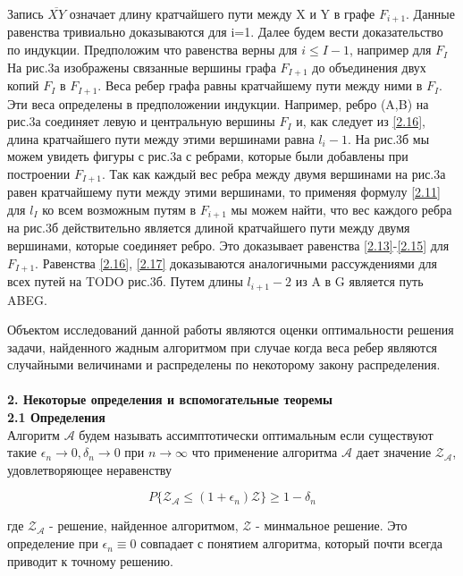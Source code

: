 \documentclass[a4paper, 14pt]{extarticle}
\begin{document}
Запись $\overline {XY}$ означает длину кратчайшего пути между X и Y в графе $F_{i+1}$. Данные равенства тривиально доказываются для i=1. Далее будем вести доказательство по индукции. Предположим что равенства верны для $i \leq I-1$, например для $F_I$ На рис.3а изображены связанные вершины графа $F_{I+1}$ до объединения двух копий $F_I$ в $F_{I+1}$. Веса ребер графа равны кратчайшему пути между ними в $F_I$. Эти веса определены в предположении индукции. Например, ребро (A,B) на рис.3а соединяет левую и центральную вершины $F_I$ и, как следует из \ref{2.16}, длина кратчайшего пути между этими вершинами равна $l_i-1$. На рис.3б мы можем увидеть фигуры с рис.3а с ребрами, которые были добавлены при построении $F_{I+1}$. Так как каждый вес ребра между двумя вершинами на рис.3а равен кратчайшему пути между этими вершинами, то применяя формулу \ref{2.11} для $l_I$ ко всем возможным путям в $F_{i+1}$ мы можем найти, что вес каждого ребра на рис.3б  действительно является длиной кратчайшего пути между двумя вершинами, которые соединяет ребро. Это доказывает равенства \ref{2.13}-\ref{2.15} для $F_{I+1}$. Равенства \ref{2.16}, \ref{2.17} доказываются аналогичными рассуждениями для всех путей на TODO рис.3б. Путем длины $l_{i+1}-2$ из A в G является путь ABEG.





Объектом исследований данной работы являются оценки оптимальности решения задачи, найденного жадным алгоритмом при случае когда веса ребер являются случайными величинами и распределены по некоторому закону распределения. \\ \\
\textbf{2. Некоторые определения и вспомогательные теоремы} \\ 

\textbf{2.1 Определения}\\

Алгоритм $\mathcal{A}$ будем называть ассимптотически оптимальным если существуют такие $\epsilon_n \rightarrow 0, \delta_n \rightarrow 0$ при $n \rightarrow \infty$ что применение алгоритма $\mathcal{A}$ дает значение  $\mathcal{Z_A}$, удовлетворяющее неравенству
 
\begin{equation}\label{1}
P\{\mathcal{Z_A} \leq (1+\epsilon_n)\mathcal{Z}\}\geq 1-\delta_n
\end{equation}

где $\mathcal{Z_A}$ - решение, найденное алгоритмом, $\mathcal{Z}$ - минмальное решение.
Это определение при $\epsilon_n \equiv 0$ совпадает с понятием алгоритма, который почти всегда приводит к точному решению. \\
\end{document}
